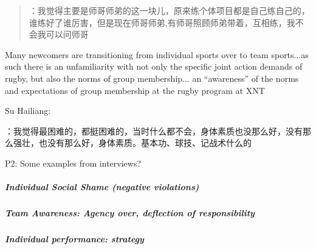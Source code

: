 \begin{CJK}{UTF8}{gbsn}
    \begin{quotation}
      ：我觉得主要是师哥师弟的这一块儿，原来练个体项目都是自己练自己的，谁练好了谁厉害，但是现在师哥师弟,有师哥照顾师弟带着，互相练，我不会我可以问师哥
    \end{quotation}










Many newcomers are transitioning from individual sports over to team sports...as such there is an unfamiliarity with not only the specific joint action demands of rugby, but also the norms of group membership... an ``awareness'' of the norms and expectations of group membership at the rugby program at XNT

Su Hailiang:

：我觉得最困难的，都挺困难的，当时什么都不会，身体素质也没那么好，没有那么强壮，也没有那么好，身体素质。基本功、球技、记战术什么的 


P2: %
          Some examples from interviews?


\subparagraph{Individual Social Shame (negative violations)}








    \subparagraph{Team Awareness: Agency over, deflection of responsibility}

  \subparagraph{Individual performance: strategy}





\end{CJK}
